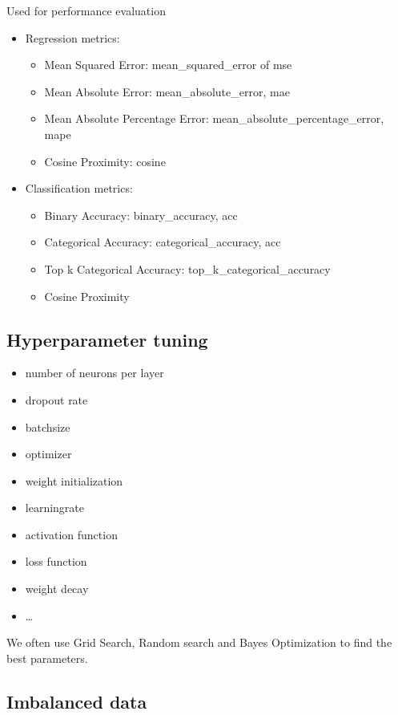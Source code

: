 \documentclass{article}
\begin{document}
Used for performance evaluation

\begin{itemize}
    \item Regression metrics:
    \begin{itemize}
        \item Mean Squared Error: mean\_squared\_error of mse
        \item Mean Absolute Error: mean\_absolute\_error, mae
        \item Mean Absolute Percentage Error: mean\_absolute\_percentage\_error, mape
        \item Cosine Proximity: cosine
    \end{itemize}
    \item Classification metrics:
    \begin{itemize}
        \item Binary Accuracy: binary\_accuracy, acc
        \item Categorical Accuracy: categorical\_accuracy, acc
        \item Top k Categorical Accuracy: top\_k\_categorical\_accuracy
        \item Cosine Proximity
    \end{itemize}
\end{itemize}

\subsection{Hyperparameter tuning}

\begin{itemize}
    \item number of neurons per layer
    \item dropout rate
    \item batchsize
    \item optimizer
    \item weight initialization
    \item learningrate
    \item activation function
    \item loss function
    \item weight decay
    \item \dots
\end{itemize}

We often use Grid Search, Random search and Bayes Optimization to find the best parameters.

\subsection{Imbalanced data}
\end{document}
